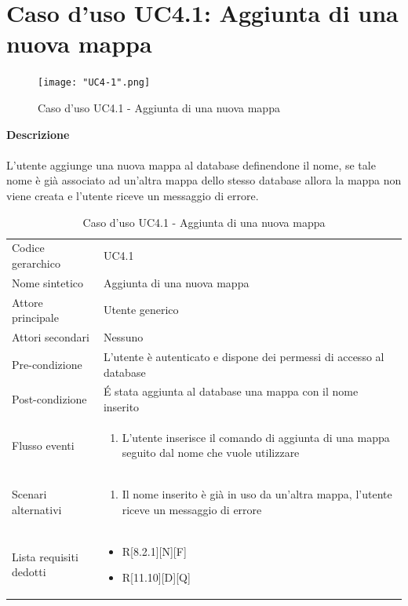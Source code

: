 \documentclass[a4paper]{report}
\begin{document}
	 \section{Caso d'uso UC4.1: Aggiunta di una nuova mappa}
	 \begin{figure}[H]
			\centering
			\texttt{[image: "UC4-1".png]}
			\caption{Caso d'uso UC4.1 - Aggiunta di una nuova mappa}
		\end{figure}
	 \textbf{Descrizione} \\ \\
	 L'utente aggiunge una nuova mappa al database definendone il nome, se tale nome è già associato ad 
	 un'altra mappa dello stesso database allora la mappa non viene creata e l'utente riceve un messaggio
	 di errore.
		\begin{table}[H]
		\begin{tabularx}{\textwidth}{X | X}\toprule
			\rowcolor{orange!65}Codice gerarchico & UC4.1 \\
			Nome sintetico & Aggiunta di una nuova mappa \\
			\rowcolor{orange!65}Attore principale & Utente generico\\
			Attori secondari & Nessuno \\
			\rowcolor{orange!65}Pre-condizione & L'utente è autenticato e dispone dei permessi di accesso
			al database\\
			Post-condizione & \'E stata aggiunta al database una mappa con il nome inserito\\
			\rowcolor{orange!65}Flusso eventi & \begin{enumerate}
			\item L'utente inserisce il comando di aggiunta di una mappa seguito dal nome che vuole utilizzare
			\end{enumerate} \\
			Scenari alternativi & \begin{enumerate}
			\item Il nome inserito è già in uso da un'altra mappa, l'utente riceve un messaggio di errore
			\end{enumerate} \\
			\rowcolor{orange!65}Lista requisiti dedotti & \begin{itemize}
				\item R[8.2.1][N][F]
				\item R[11.10][D][Q]
				\end{itemize} \\
			\bottomrule
		\end{tabularx}
		\caption{Caso d'uso UC4.1 - Aggiunta di una nuova mappa}
	 \end{table}
\end{document}
